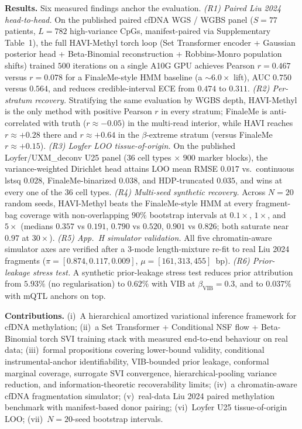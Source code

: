 {\smallskip\textbf{Results.} Six measured findings anchor the evaluation. \emph{(R1) Paired Liu 2024 head-to-head.} On the published paired cfDNA WGS / WGBS panel ($S=77$ patients, $L=782$ high-variance CpGs, manifest-paired via Supplementary Table~1), the full HAVI-Methyl torch loop (Set Transformer encoder + Gaussian posterior head + Beta-Binomial reconstruction + Robbins-Monro population shifts) trained $500$ iterations on a single A10G GPU achieves Pearson $r = 0.467$ versus $r = 0.078$ for a FinaleMe-style HMM baseline (a $\sim 6.0\times$ lift), AUC $0.750$ versus $0.564$, and reduces credible-interval ECE from $0.474$ to $0.311$. \emph{(R2) Per-stratum recovery.} Stratifying the same evaluation by WGBS depth, HAVI-Methyl is the only method with positive Pearson $r$ in every stratum; FinaleMe is anti-correlated with truth ($r \approx -0.05$) in the multi-read interior, while HAVI reaches $r \approx +0.28$ there and $r \approx +0.64$ in the $\beta$-extreme stratum (versus FinaleMe $r \approx +0.15$). \emph{(R3) Loyfer LOO tissue-of-origin.} On the published Loyfer/UXM\_deconv U25 panel ($36$ cell types $\times$ $900$ marker blocks), the variance-weighted Dirichlet head attains LOO mean RMSE $0.017$ vs.\ continuous lstsq $0.028$, FinaleMe-binarized $0.038$, and HDP-truncated $0.035$, and wins at every one of the $36$ cell types. \emph{(R4) Multi-seed synthetic recovery.} Across $N=20$ random seeds, HAVI-Methyl beats the FinaleMe-style HMM at every fragment-bag coverage with non-overlapping $90\%$ bootstrap intervals at $0.1\times$, $1\times$, and $5\times$ (medians $0.357$ vs $0.191$, $0.790$ vs $0.520$, $0.901$ vs $0.826$; both saturate near $0.97$ at $30\times$). \emph{(R5) App.~H simulator validation.} All five chromatin-aware simulator axes are verified after a 3-mode length-mixture re-fit to real Liu 2024 fragments ($\pi = [0.874, 0.117, 0.009]$, $\mu = [161, 313, 455]$~bp). \emph{(R6) Prior-leakage stress test.} A synthetic prior-leakage stress test reduces prior attribution from $5.93\%$ (no regularisation) to $0.62\%$ with VIB at $\beta_{\mathrm{VIB}}=0.3$, and to $0.037\%$ with mQTL anchors on top.

\smallskip\textbf{Contributions.} (i)~A hierarchical amortized variational inference framework for cfDNA methylation; (ii)~a Set Transformer + Conditional NSF flow + Beta-Binomial torch SVI training stack with measured end-to-end behaviour on real data; (iii)~formal propositions covering lower-bound validity, conditional instrumental-anchor identifiability, VIB-bounded prior leakage, conformal marginal coverage, surrogate SVI convergence, hierarchical-pooling variance reduction, and information-theoretic recoverability limits; (iv)~a chromatin-aware cfDNA fragmentation simulator; (v)~real-data Liu 2024 paired methylation benchmark with manifest-based donor pairing; (vi)~Loyfer U25 tissue-of-origin LOO; (vii)~$N{=}20$-seed bootstrap intervals.
}
